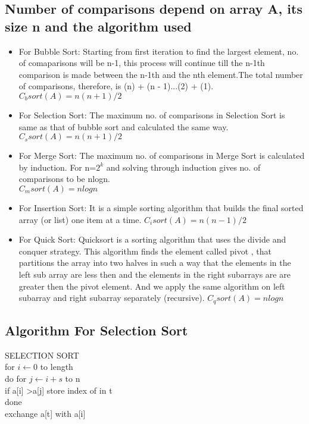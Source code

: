 \documentclass[22pt]{IEEEtran}
\begin{document}
\subsection{Number of comparisons depend on array A, its size n and the algorithm used}
\begin{itemize}
    \item For Bubble Sort: Starting from first iteration to find the largest element, no. of comaparisons will be n-1, this process will continue till the n-1th comparison is made between the n-1th and the nth element.The total number of comparisons, therefore, is (n) + (n - 1)...(2) + (1).\\
    $C_bsort(A) = n(n+1)/2$\\
    \item For Selection Sort: The maximum no. of comparisons in Selection Sort is same as that of bubble sort and calculated the same way.
    $C_ssort(A) = n(n+1)/2$\\
    \item For Merge Sort: The maximum no. of comparisons in Merge Sort is calculated by induction. For n=$2^k$ and solving through induction gives no. of comparisons to be nlogn.\\
    $C_msort(A) = nlogn$\\
    \item For Insertion Sort: It is a simple sorting algorithm that builds the final sorted array (or list) one item at a time.
    $C_isort(A) = n(n-1)/2$\\
    \item For Quick Sort: Quicksort is a sorting algorithm that uses the divide and conquer strategy. This algorithm finds the element called pivot , that partitions the array into two halves in such a way that the elements in the left sub array are less then and the elements in the right subarrays are are greater then the pivot element. And we apply the same algorithm on left subarray and right subarray separately (recursive).
    $C_qsort(A) = nlogn$\\
\end{itemize}

\subsection{Algorithm For Selection Sort}
\begin{algorithmic}{SELECTION SORT}\\
for \STATE $i \leftarrow 0$ to length\\
do for \STATE $j \leftarrow i+s$ to n\\
if a[i] \textgreater a[j]
store index of  in t\\ done\\
exchange a[t] with a[i]

\end{algorithmic}
\end{document}
